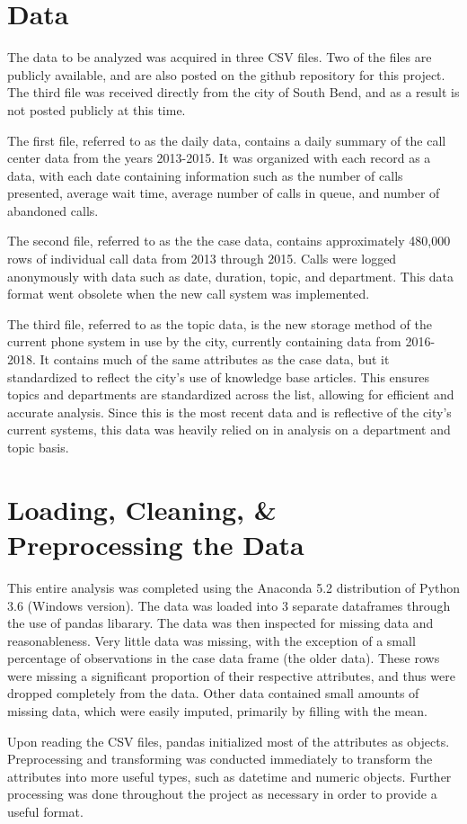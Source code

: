\documentclass[11pt,twocolumn]{article}
\begin{document}
\section{Data}
The data to be analyzed was acquired in three CSV files.  Two of the files are publicly available, and are also posted on the github repository for this project.  The third file was received directly from the city of South Bend, and as a result is not posted publicly at this time.
\par
The first file, referred to as the daily data, contains a daily summary of the call center data from the years 2013-2015.  It was organized with each record as a data, with each date containing information such as the number of calls presented, average wait time, average number of calls in queue, and number of abandoned calls.
\par
The second file, referred to as the the case data, contains approximately 480,000 rows of individual call data from 2013 through 2015.  Calls were logged anonymously with data such as date, duration, topic, and department.  This data format went obsolete when the new call system was implemented.
\par
The third file, referred to as the topic data, is the new storage method of the current phone system in use by the city, currently containing data from 2016-2018.  It contains much of the same attributes as the case data, but it standardized to reflect the city's use of knowledge base articles.  This ensures topics and departments are standardized across the list, allowing for efficient and accurate analysis.  Since this is the most recent data and is reflective of the city's current systems, this data was heavily relied on in analysis on a department and topic basis.

\section{Loading, Cleaning, \& Preprocessing the Data}
This entire analysis was completed using the Anaconda 5.2 distribution of Python 3.6 (Windows version).  The data was loaded into 3 separate dataframes through the use of pandas libarary.  The data was then inspected for missing data and reasonableness.  Very little data was missing, with the exception of a small percentage of observations in the case data frame (the older data).  These rows were missing a significant proportion of their respective attributes, and thus were dropped completely from the data.  Other data contained small amounts of missing data, which were easily imputed, primarily by filling with the mean.
\par
Upon reading the CSV files, pandas initialized most of the attributes as objects.  Preprocessing and transforming was conducted immediately to transform the attributes into more useful types, such as datetime and numeric objects.  Further processing was done throughout the project as necessary in order to provide a useful format.
\end{document}

